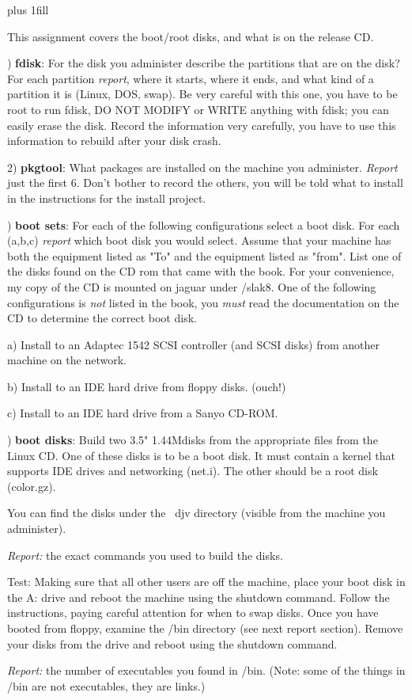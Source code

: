 
\rightskip=0pt plus 1fill

\parindent 0pt

This assignment covers the boot/root disks, and what is on the release CD.

) {\bf fdisk}:
For the disk you administer describe the partitions that are on the disk?
For each partition {\it report}, where it starts, where it ends, and what kind
of a partition it is (Linux, DOS, swap).
Be very careful with this one, you have to be root to run fdisk,
DO NOT MODIFY or WRITE anything with fdisk; 
you can easily erase the disk.
Record the information very carefully, you have to use this information
to rebuild after your disk crash.

2) {\bf pkgtool}:
What packages are installed on the machine you administer.
{\it Report} just the first 6. Don't bother to record the others, you will
be told what to install in the instructions for the install project.

) {\bf boot sets}:
For each of the following configurations select a boot disk.
For each (a,b,c) {\it report} which boot disk you would select.
Assume that your machine has both the equipment listed as "To" and the
equipment listed as "from".
List one of the disks found on the CD rom that came with the book.
For your convenience, my copy of the CD is mounted on {\ltt{}jaguar} under
{\ltt{}/slak8}. 
One of the following configurations is {\it not} listed in the book,
you {\it must} read the documentation on the CD to determine the correct
boot disk.

a) Install to an Adaptec 1542 SCSI controller (and SCSI disks) from another
machine on the network.

b) Install to an IDE hard drive from floppy disks. (ouch!)

c) Install to an IDE hard drive from a Sanyo CD-ROM.

) {\bf boot disks}:
Build two 3.5" 1.44Mdisks from the appropriate files from the Linux CD.
One of these disks is to be a boot disk.
It must contain a kernel that supports IDE drives
and networking ({\ltt{}net.i}).
The other should be a root disk ({\ltt{}color.gz}).

You can find the disks under the {\ltt{}~djv}
directory (visible from the machine you administer).

{\it Report:} the exact commands you used to build the disks.

Test: Making sure that all other users are off the machine,
place your boot disk in the A: drive and
reboot the machine using the shutdown command.
Follow the instructions, paying careful attention for when to swap disks.
Once you have booted from floppy, examine the {\ltt{}/bin} directory
(see next report section).
Remove your disks from the drive and reboot using the shutdown command.

{\it Report:} the number of executables you found in {\ltt{}/bin}.
(Note: some of the things in {\ltt{}/bin} are not executables, they are links.)

\bye
